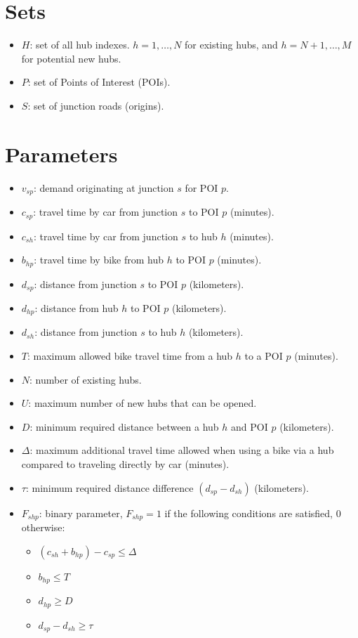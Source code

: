\documentclass{article}
\begin{document}
\section{Sets}
\begin{itemize}[leftmargin=*,nosep]
    \item $H$: set of all hub indexes. $h = 1, \dots, N$ for existing hubs, and $h = N+1, \dots, M$ for potential new hubs.
    \item $P$: set of Points of Interest (POIs).
    \item $S$: set of junction roads (origins).
\end{itemize}

\section{Parameters}
\begin{itemize}[leftmargin=*,nosep]
    \item $v_{sp}$: demand originating at junction $s$ for POI $p$.
    \item $c_{sp}$: travel time by car from junction $s$ to POI $p$ (minutes).
    \item $c_{sh}$: travel time by car from junction $s$ to hub $h$ (minutes).
    \item $b_{hp}$: travel time by bike from hub $h$ to POI $p$ (minutes).
    \item $d_{sp}$: distance from junction $s$ to POI $p$ (kilometers).
    \item $d_{hp}$: distance from hub $h$ to POI $p$ (kilometers).
    \item $d_{sh}$: distance from junction $s$ to hub $h$ (kilometers).
    \item $T$: maximum allowed bike travel time from a hub $h$ to a POI $p$ (minutes).
    \item $N$: number of existing hubs.
    \item $U$: maximum number of new hubs that can be opened.
    \item $D$: minimum required distance between a hub $h$ and POI $p$ (kilometers).
    \item $\Delta$: maximum additional travel time allowed when using a bike via a hub compared to traveling directly by car (minutes).
    \item $\tau$: minimum required distance difference $(d_{sp} - d_{sh})$ (kilometers).
    \item $F_{shp}$: binary parameter, $F_{shp} = 1$ if the following conditions are satisfied, $0$ otherwise:
    \begin{itemize}
        \item $(c_{sh} + b_{hp}) - c_{sp} \leq \Delta$
        \item $b_{hp} \leq T$
        \item $d_{hp} \geq D$
        \item $d_{sp} - d_{sh} \geq \tau$
    \end{itemize}
\end{itemize}
\end{document}

